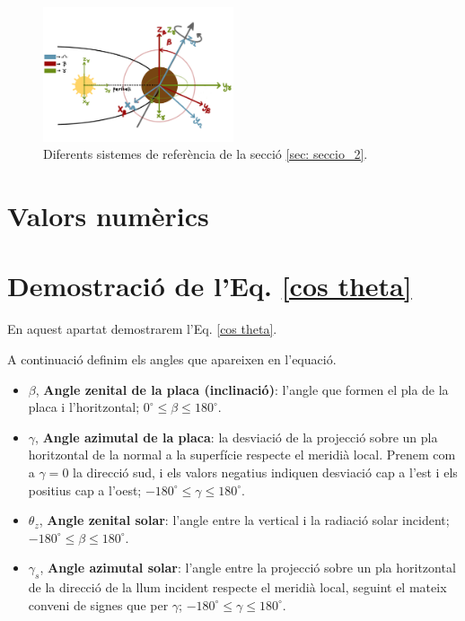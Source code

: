 \documentclass[11pt]{article}
\begin{document}
\begin{figure}[hbt]
    \centering
    \includegraphics[width=0.5\textwidth]{sist_ref.PNG}
    \caption{Diferents sistemes de referència de la secció \ref{sec: seccio_2}.}
    \label{fig: sist_ref}
\end{figure}

\section{Valors numèrics}
\label{sec: valors numerics}
\section{Demostració de l'Eq. \eqref{cos theta}}
\label{sec: cos theta}
En aquest apartat demostrarem l'Eq. \eqref{cos theta}.

A continuació definim els angles que apareixen en l'equació.
\begin{itemize}
    \item $\beta$, \textbf{Angle zenital de la placa (inclinació)}: l'angle que formen el pla de la placa i l'horitzontal; $0^\circ \leq \beta \leq 180^\circ$.
    \item $\gamma$, \textbf{Angle azimutal de la placa}: la desviació de la projecció sobre un pla horitzontal de la normal a la superfície respecte el meridià local. Prenem com a $\gamma=0$ la direcció sud, i els valors negatius indiquen desviació cap a l'est i els positius cap a l'oest; $-180^\circ \leq \gamma \leq 180^\circ$.
    \item $\theta_z$, \textbf{Angle zenital solar}: l'angle entre la vertical i la radiació solar incident; $-180^\circ \leq \beta \leq 180^\circ$.
    \item $\gamma_s$, \textbf{Angle azimutal solar}: l'angle entre la projecció sobre un pla horitzontal de la direcció de la llum incident respecte el meridià local, seguint el mateix conveni de signes que per $\gamma$; $-180^\circ \leq \gamma \leq 180^\circ$.
\end{itemize}
\end{document}
